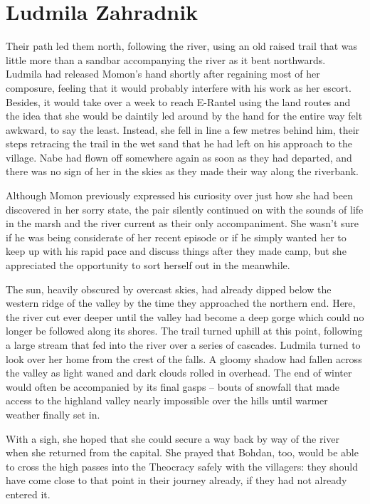 \chapter{Ludmila Zahradnik}
Their path led them north, following the river, using an old raised trail that was little more than a sandbar accompanying the river as it bent northwards. Ludmila had released Momon’s hand shortly after regaining most of her composure, feeling that it would probably interfere with his work as her escort. Besides, it would take over a week to reach E-Rantel using the land routes and the idea that she would be daintily led around by the hand for the entire way felt awkward, to say the least. Instead, she fell in line a few metres behind him, their steps retracing the trail in the wet sand that he had left on his approach to the village. Nabe had flown off somewhere again as soon as they had departed, and there was no sign of her in the skies as they made their way along the riverbank.

 

Although Momon previously expressed his curiosity over just how she had been discovered in her sorry state, the pair silently continued on with the sounds of life in the marsh and the river current as their only accompaniment. She wasn’t sure if he was being considerate of her recent episode or if he simply wanted her to keep up with his rapid pace and discuss things after they made camp, but she appreciated the opportunity to sort herself out in the meanwhile.

 

The sun, heavily obscured by overcast skies, had already dipped below the western ridge of the valley by the time they approached the northern end. Here, the river cut ever deeper until the valley had become a deep gorge which could no longer be followed along its shores. The trail turned uphill at this point, following a large stream that fed into the river over a series of cascades. Ludmila turned to look over her home from the crest of the falls. A gloomy shadow had fallen across the valley as light waned and dark clouds rolled in overhead. The end of winter would often be accompanied by its final gasps – bouts of snowfall that made access to the highland valley nearly impossible over the hills until warmer weather finally set in.

 

With a sigh, she hoped that she could secure a way back by way of the river when she returned from the capital. She prayed that Bohdan, too, would be able to cross the high passes into the Theocracy safely with the villagers: they should have come close to that point in their journey already, if they had not already entered it.

